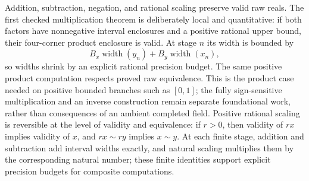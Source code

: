 \begin{proposition}\label{prop:raw-arithmetic-valid}
{\footnotesize\raggedright
{}\par
{}\par
{}\par
{}\par
{}\par
{}\par
{}\par
{}\par
{}\par
{}\par
{}\par
{}\par}
Addition, subtraction, negation, and rational scaling preserve valid raw
reals.  The first checked multiplication theorem is deliberately local and
quantitative: if both factors have nonnegative interval enclosures and a
positive rational upper bound, their four-corner product enclosure is valid.
At stage \(n\) its width is bounded by
\[
 B_x\operatorname{width}(y_n)+B_y\operatorname{width}(x_n),
\]
so widths shrink by an explicit rational precision budget.  The same positive
product computation respects proved raw equivalence.  This is the product
case needed on positive bounded branches such as \([0,1]\); the fully
sign-sensitive multiplication and an inverse construction remain separate
foundational work, rather than consequences of an ambient completed field.
Positive rational scaling is reversible at the level of validity and
equivalence: if \(r>0\), then validity of \(rx\) implies validity of \(x\),
and \(rx\sim ry\) implies \(x\sim y\).
At each finite stage, addition and subtraction add interval widths exactly,
and natural scaling multiplies them by the corresponding natural number; these
finite identities support explicit precision budgets for composite
computations.
\end{proposition}

